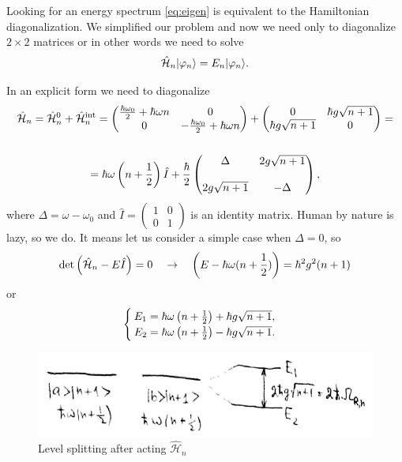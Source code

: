 Looking for an energy spectrum \eqref{eq:eigen} is equivalent to the Hamiltonian diagonalization.
We simplified our problem and now we need only to diagonalize $2 \times 2$ matrices or in other words we need to solve
\begin{equation}
	\hat{\mathcal{H}}_n \lvert\varphi_n\rangle = E_n \lvert\varphi_n\rangle.
\end{equation}

In an explicit form we need to diagonalize
\begin{multline}
	\hat{\mathcal{H}}_n = \hat{\mathcal{H}}^0_{n} + \hat{\mathcal{H}}^{\text{int}}_n = 
	\begin{pmatrix}
		\frac{\hbar \omega_0}{2} + \hbar \omega n & 0 \\
		0 & - \frac{\hbar \omega_0}{2} + \hbar \omega n
	\end{pmatrix} +
	\begin{pmatrix}
		0 & \hbar g \sqrt{n+1} \\
		\hbar g \sqrt{n+1} & 0
	\end{pmatrix} = \\ \\ =
	\hbar \omega \left( n+ \frac{1}{2} \right) \hat{I}
	+ \frac{\hbar}{2} \begin{pmatrix}
		\Delta & 2g \sqrt{n+1} \\ \\
		2g \sqrt{n+1} & - \Delta
	\end{pmatrix},
\end{multline}
where $\Delta = \omega - \omega_0$ and $\hat{I} = \begin{pmatrix}
1 & 0 \\
0 & 1
\end{pmatrix}$ is an identity matrix. Human by nature is lazy, so we do. It means let us consider a simple case when $\Delta = 0$, so
\begin{equation}
	\det \left( \hat{\mathcal{H}}_n - E \hat{I} \right) = 0 \quad \to \quad \left( E - \hbar \omega (n + \frac{1}{2}) \right) = \hbar^2 g^2 (n+1)
\end{equation} 
or
\begin{equation}
	\begin{cases}
		E_1 = \hbar \omega \left( n + \frac{1}{2} \right) + \hbar g \sqrt{n+1}, \\
		E_2 = \hbar \omega \left( n + \frac{1}{2} \right) - \hbar g \sqrt{n+1}.
	\end{cases}
\end{equation}
\begin{figure}
	\centering
	\includegraphics[width=0.7\linewidth]{fig/L6/leveeeelllls}
	\caption{Level splitting after acting $\hat{\mathcal{H}}_n$}
	\label{fig:leveeeelllls}
\end{figure}
